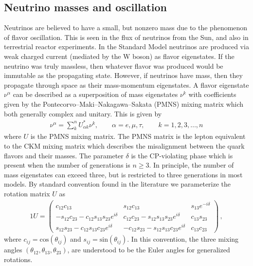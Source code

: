 \documentclass[universe,article,submit,moreauthors,pdftex,a4paper]{Definitions/mdpi}
\begin{document}
\subsection{Neutrino masses and oscillation} \label{sec:Neutrinos}
\noindent Neutrinos are believed to have a small, but nonzero mass due to the phenomenon of flavor oscillation. This is seen in the flux of neutrinos from the Sun, and also in terrestrial reactor experiments. In the Standard Model neutrinos are produced via weak charged current (mediated by the W boson) as flavor eigenstates. If the neutrino was truly massless, then whatever flavor was produced would be immutable as the propagating state. However, if neutrinos have mass, then they propagate through space as their mass-momentum eigenstates. A flavor eigenstate $\nu^{\alpha}$ can be described as a superposition of mass eigenstates $\nu^{k}$ with coefficients given by the Pontecorvo–Maki–Nakagawa–Sakata (PMNS) mixing matrix which both generally complex and unitary. This is given by
\begin{align}\label{NuFlavors}
	\nu^{\alpha}=\sum_k^nU^\ast_{\alpha k}\nu^{k}, \qquad\alpha=e,\mu,\tau,\qquad k=1,2,3,\dots,n
\end{align}
where $U$ is the PMNS mixing matrix. The PMNS matrix is the lepton equivalent to the CKM mixing matrix which describes the misalignment between the quark flavors and their masses. The parameter $\delta$ is the CP-violating phase which is present when the number of generations is $n\geq3$. In principle, the number of mass eigenstates can exceed three, but is restricted to three generations in most models. By standard convention found in the literature we parameterize the rotation matrix $U$ as
	\begin{alignat}{1}
 	\label{PMNS} U =
		\begin{pmatrix}
			c_{12}c_{13} & s_{12}c_{13} & s_{13}e^{-i\delta}\\
			-s_{12}c_{23} - c_{12}s_{13}s_{23}e^{i\delta} & c_{12}c_{23} - s_{12}s_{13}s_{23}e^{i\delta} & c_{13}s_{23}\\
			s_{12}s_{23} - c_{12}s_{13}c_{23}e^{i\delta}& -c_{12}s_{23} - s_{12}s_{13}c_{23}e^{i\delta} & c_{13}c_{23}
		\end{pmatrix}\,,
	\end{alignat}
where $c_{ij} = \mathrm{cos}(\theta_{ij})$ and $s_{ij} = \mathrm{sin}(\theta_{ij})$. In this convention, the three mixing angles $(\theta_{12}, \theta_{13}, \theta_{23})$, are understood to be the Euler angles for generalized rotations.
\end{document}
